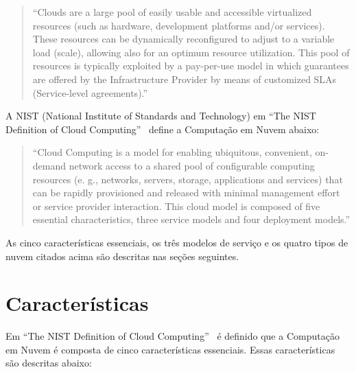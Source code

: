 	\begin{quotation}
		``Clouds are a large pool of easily usable and accessible virtualized resources (such as hardware, development platforms and/or services). These resources can be dynamically reconfigured to adjust to a variable load (scale), allowing also for an optimum resource utilization. This pool of resources is typically exploited by a pay-per-use model in which guarantees are offered by the Infrastructure Provider by means of customized SLAs (Service-level agreements).''
	\end{quotation}
	
	A NIST (National Institute of Standards and Technology) em ``The NIST Definition of Cloud Computing''~\citeyearpar{NIST:2011} define a Computação em Nuvem abaixo:
	
	\begin{quotation}
		``Cloud Computing is a model for enabling ubiquitous, convenient, on-demand network access to a shared pool of configurable computing resources (e. g., networks, servers,             storage, applications and services) that can be rapidly provisioned and released with minimal management effort or service provider interaction. This cloud model is composed of five essential characteristics, three service models and four deployment models.''
	\end{quotation}	
	
	As cinco características essenciais, os três modelos de serviço e os quatro tipos de nuvem citados acima são descritas nas seções seguintes.		

\section{Características} \label{cloud:char}
	Em ``The NIST Definition of Cloud Computing''~\citeyearpar{NIST:2011} é definido que a Computação em Nuvem é composta de cinco características essenciais. Essas características são descritas abaixo:   

